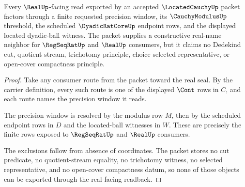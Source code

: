 \begin{theorem}
\label{thm:locatedcauchy-real-seal-boundary}
Every $\RealUp$-facing read exported by an accepted $\LocatedCauchyUp$ packet
factors through a finite requested precision window, its $\CauchyModulusUp$
threshold, the scheduled $\DyadicRatCoreUp$ endpoint rows, and the displayed
located dyadic-ball witness. The packet supplies a constructive real-name
neighbor for $\RegSeqRatUp$ and $\RealUp$ consumers, but it claims no Dedekind
cut, quotient stream, trichotomy principle, choice-selected representative, or
open-cover compactness principle.
\end{theorem}
\begin{proof}
Take any consumer route from the packet toward the real seal. By the carrier
definition, every such route is one of the displayed $\Cont$ rows in $C$, and
each route names the precision window it reads.

The precision window is resolved by the modulus row $M$, then by the scheduled
endpoint rows in $D$ and the located-ball witnesses in $W$. These are precisely
the finite rows exposed to $\RegSeqRatUp$ and $\RealUp$ consumers.

The exclusions follow from absence of coordinates. The packet stores no cut
predicate, no quotient-stream equality, no trichotomy witness, no selected
representative, and no open-cover compactness datum, so none of those objects
can be exported through the real-facing readback.
\end{proof}

